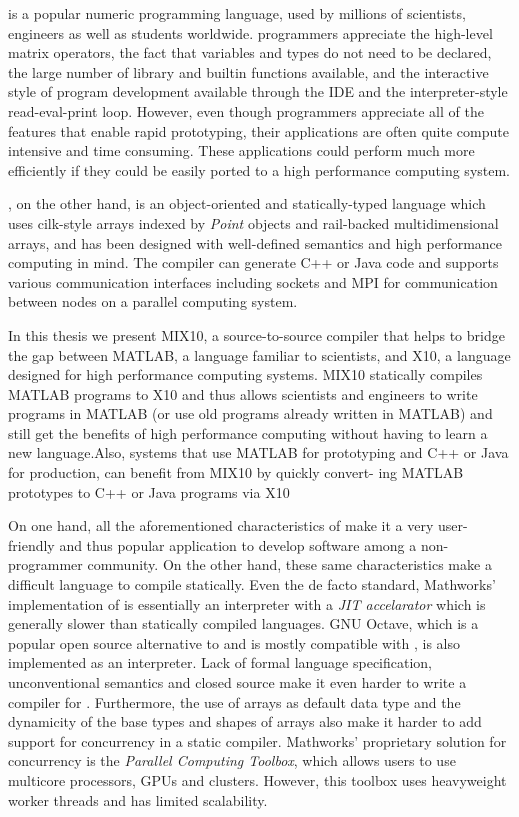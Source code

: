 \matlab is a popular numeric programming language, used by millions of
scientists, engineers as well as students worldwide\cite{MatlabGrowth}.  \matlab
programmers appreciate the high-level matrix operators,  the fact that variables
and types do not need to be declared, the large number of library and builtin
functions available, and the interactive style of program development available
through the IDE and the interpreter-style read-eval-print loop.  However, even
though \matlab programmers appreciate all of the features that enable rapid
prototyping,  their applications are often quite compute intensive and time
consuming. These applications could perform much more efficiently if they could
be easily ported to a high performance computing system.  

\xten\cite{x10}, on the other hand, is an object-oriented and statically-typed
language which uses cilk-style arrays indexed by \emph{Point} objects and
rail-backed multidimensional arrays, and has been designed with well-defined
semantics and high performance computing in mind.  The \xten compiler can
generate C++ or Java code and supports various communication interfaces
including sockets and MPI for communication between nodes on a parallel
computing system.

In this thesis we present MIX10, a source-to-source compiler that helps to
bridge the gap between MATLAB, a language familiar to scientists, and X10, a
language designed for high performance computing systems. MIX10 statically
compiles MATLAB programs to X10 and thus allows scientists and engineers to
write programs in MATLAB (or use old programs already written in MATLAB) and
still get the benefits of high performance computing without having to learn a
new language.Also, systems that use MATLAB for prototyping and C++ or Java for
production, can benefit from MIX10 by quickly convert- ing MATLAB prototypes to
C++ or Java programs via X10

On one hand, all the aforementioned characteristics of \matlab make it a very
user-friendly and thus popular application to develop software among a
non-programmer community. On the other hand, these same characteristics make
\matlab a difficult language to compile statically. Even the de facto standard,
Mathworks' implementation of \matlab is essentially an interpreter with a
\emph{JIT accelarator}\cite{matlabjit} which is generally slower than statically
compiled languages. GNU Octave, which is a popular open source alternative to
\matlab and is mostly compatible with \matlab, is also implemented as an
interpreter\cite{Octave}.  Lack of formal language specification, unconventional
semantics and closed source make it even harder to write a compiler for \matlab.
Furthermore, the use of arrays as default data type and the dynamicity of the
base types and shapes of arrays also make it harder to add support for
concurrency in a static \matlab compiler.  Mathworks' proprietary solution for
concurrency is the \emph{Parallel Computing Toolbox}\cite{pct}, which allows
users to use multicore processors, GPUs and clusters. However, this toolbox uses
heavyweight worker threads and has limited scalability.

